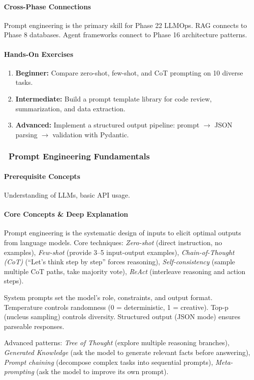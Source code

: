 \documentclass[11pt, a4paper, oneside]{report}
\newcommand{\mustmaster}[1]{\subsubsection{\texorpdfstring{\fcolorbox{blue!40!black}{blue!8}{\footnotesize\bfseries\color{blue!40!black} MUST MASTER}~#1}{#1}}}
\newcommand{\arrow}{$\rightarrow$}
\begin{document}
\paragraph{Cross-Phase Connections} Prompt engineering is the primary skill for Phase 22 LLMOps. RAG connects to Phase 8 databases. Agent frameworks connect to Phase 16 architecture patterns.

\paragraph{Hands-On Exercises}
\begin{enumerate}[leftmargin=*]
\item \textbf{Beginner:} Compare zero-shot, few-shot, and CoT prompting on 10 diverse tasks.
\item \textbf{Intermediate:} Build a prompt template library for code review, summarization, and data extraction.
\item \textbf{Advanced:} Implement a structured output pipeline: prompt \arrow{} JSON parsing \arrow{} validation with Pydantic.
\end{enumerate}


\mustmaster{Prompt Engineering Fundamentals}

\paragraph{Prerequisite Concepts} Understanding of LLMs, basic API usage.

\paragraph{Core Concepts \& Deep Explanation} Prompt engineering is the systematic design of inputs to elicit optimal outputs from language models. Core techniques: \emph{Zero-shot} (direct instruction, no examples), \emph{Few-shot} (provide 3--5 input-output examples), \emph{Chain-of-Thought (CoT)} (``Let's think step by step'' forces reasoning), \emph{Self-consistency} (sample multiple CoT paths, take majority vote), \emph{ReAct} (interleave reasoning and action steps).

System prompts set the model's role, constraints, and output format. Temperature controls randomness (0 = deterministic, 1 = creative). Top-p (nucleus sampling) controls diversity. Structured output (JSON mode) ensures parseable responses.

Advanced patterns: \emph{Tree of Thought} (explore multiple reasoning branches), \emph{Generated Knowledge} (ask the model to generate relevant facts before answering), \emph{Prompt chaining} (decompose complex tasks into sequential prompts), \emph{Meta-prompting} (ask the model to improve its own prompt).
\end{document}
